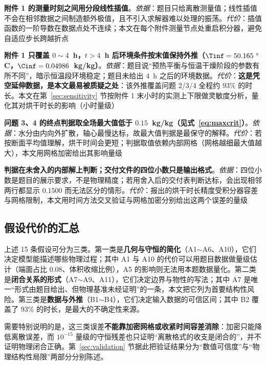\begin{assumptionlist}
\item[\textbf{B1}] \textbf{附件 1 的测量时刻之间用\textbf{分段线性插值}}。\emph{依据}：题目只给离散测量值；线性插值不会在相邻数据之间制造额外极值，且不引入求解器难以处理的振荡。\emph{代价}：插值函数的一阶导数在数据点处不连续；本文在每个附件测量节点处重启积分器，避免自适应步长跨越折点
\item[\textbf{B2}] \textbf{附件 1 只覆盖 $0\sim4$~h，\textbf{$t>4$~h 后环境条件按末值保持外推}（$\Tinf=50.165~^\circ$C，$\Cinf=0.04986$~kg/kg）}。\emph{依据}：题目说``预热平衡与恒温干燥阶段的参数有所不同''，暗示恒温段环境稳定；题目未给出 $4$~h 之后的环境数据。\emph{代价}：\textbf{这是凭空延伸数据，是本文最易被质疑之处}：该外推覆盖问题 2/3/4 全程约 $93\%$ 的时长。本文在第~\ref{sec:sensitivity} 节按附件 1 末小时的实测上下限做灵敏度分析，量化其对烘干时长的影响（小时量级）
\item[\textbf{B3}] \textbf{问题 3、4 的终点判据取\textbf{全场最大值}低于 $0.15$~kg/kg（见式~\eqref{eq:maxcrit}）}。\emph{依据}：水分由内向外扩散，轴心最慢达标，故最大值判据是最保守的解释。\emph{代价}：若按断面平均值理解，烘干时间会更短；判据取值依赖内部网格（网格越细最大值越大），本文用网格加密给出其影响量级
\item[\textbf{B4}] \textbf{判据在\textbf{未舍入}的内部解上判断；交付文件的四位小数只是输出格式}。\emph{依据}：四位小数是题目的展示要求，不是物理精度；若用舍入后的交付表判断达标，会出现相邻两行都显示 $0.1500$ 而无法区分的情形。\emph{代价}：报出的烘干时长精度受积分器容差与网格限制，本文用时间方法交叉验证与网格加密分别给出这两个误差的量级
\end{assumptionlist}

\subsection{假设代价的汇总}

上述 15 条假设可分为三类。第一类是\textbf{几何与守恒的简化}（A1$\sim$A6、A10），它们决定模型能描述哪些物理过程；其中 A1 与 A10 的代价可以用题目数据做量级估计（端面占比 $0.08$、体积收缩比例），A5 的影响则无法用本题数据量化。第二类是\textbf{闭合关系的形式}（A7$\sim$A9、A11），它们决定边界与物性的写法；其中 A7 是唯一``形式由题目给出、但物理基准未经证明''的一条，本文把它列为首要结构性风险。第三类是\textbf{数据与外推}（B1$\sim$B4），它们决定输入数据的可信区间；其中 B2 覆盖了 $93\%$ 的时长，是最大的不确定性来源。

需要特别说明的是，这三类误差\textbf{不能靠加密网格或收紧时间容差消除}：加密只能降低离散误差，而 $10^{-15}$ 量级的守恒残差也只证明``离散格式的收支是闭合的''，并不证明物理闭合正确。第~\ref{sec:validation} 节据此把验证结果分为``数值可信度''与``物理结构性局限''两部分分别陈述。
